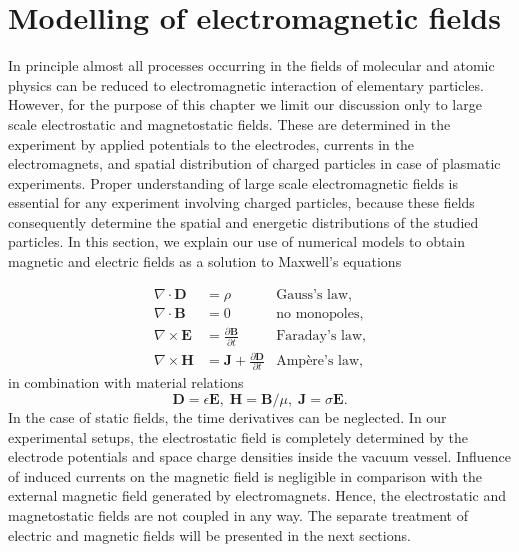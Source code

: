 
\chapter{Modelling of electromagnetic fields}

\label{ch:Modelling}In principle almost all processes occurring in
the fields of molecular and atomic physics can be reduced to electromagnetic
interaction of elementary particles. However, for the purpose of this
chapter we limit our discussion only to large scale electrostatic
and magnetostatic fields. These are determined in the experiment by
applied potentials to the electrodes, currents in the electromagnets,
and spatial distribution of charged particles in case of plasmatic
experiments. Proper understanding of large scale electromagnetic fields
is essential for any experiment involving charged particles, because these fields
consequently determine the spatial and energetic distributions of the studied
particles. In this
section, we explain our use of numerical models to obtain magnetic
and electric fields as a solution to Maxwell's equations

\begin{subequations}
\begin{align}
\nabla\cdot\mathbold{D} & =  \rho & \text{Gauss's law,}
\label{eq:sim:gauss}\\
\nabla\cdot\mathbold{B} & =  0 &\text{no monopoles,}
\label{eq:sim:nomono}\\
\nabla\times\mathbold{E} & =  \frac{\partial\mathbold{B}}{\partial t} 
&\text{Faraday's law,}
\label{eq:sim:faraday}\\
\nabla\times\mathbold{H} & =  \mathbold{J}+\frac{\partial\mathbold{D}}{\partial t}
&\text{Amp\`ere's law,}
\label{eq:sim:ampere}
\end{align}
\label{eq:sim:maxwell}
\end{subequations}
in combination with material relations
\begin{equation}
\mathbold{D}=\epsilon\mathbold{E},\;\mathbold{H}=\mathbold{B}/\mu,\;\mathbold{J}=\sigma\mathbold{E}\text{.}
\label{eq:sim:materials}
\end{equation}
In the case of static fields, the time derivatives can be neglected.
In our experimental setups, the electrostatic field is completely
determined by the electrode potentials and space charge densities
inside the vacuum vessel. Influence of induced currents on the magnetic
field is negligible in comparison with the external magnetic field
generated by electromagnets. Hence, the electrostatic and magnetostatic
fields are not coupled in any way. The separate treatment of electric
and magnetic fields will be presented in the next sections. 

